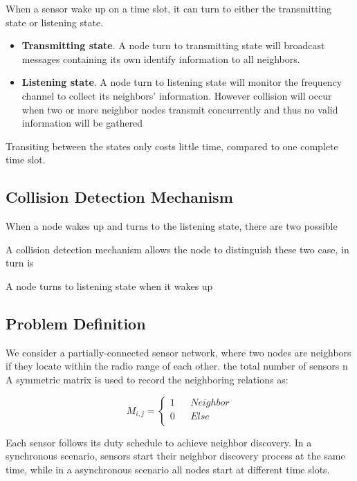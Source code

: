 When a sensor wake up on a time slot, it can turn to either the transmitting state or listening state. 
\begin{itemize}
\item \textbf{Transmitting state}. A node turn to transmitting state will broadcast messages containing its own identify 
information to all neighbors.
\item  \textbf{Listening state}. A node turn to listening state will monitor the frequency channel to collect its neighbors' information.
However collision will occur when two or more neighbor nodes transmit concurrently and thus no valid information will be gathered
\end{itemize}
Transiting between the states only costs little time, compared to one complete time slot.

\subsection{Collision Detection Mechanism}

When a node wakes up and turns to the listening state, there are two possible 



A collision detection mechanism allows the node to distinguish these two case, in turn is 


A node turns to listening state when it wakes up




\subsection{Problem Definition}

We consider a partially-connected sensor network, 
where two nodes are neighbors if they locate within the radio range of each other. the total number of sensors n
A  symmetric matrix is used to record the neighboring relations as:

$$ M_{i,j}=\left\{
\begin{aligned}
1  & & {Neighbor}\\
0  & & {Else}\\
\end{aligned}
\right.
$$

Each sensor follows its duty schedule to achieve neighbor discovery. In a synchronous scenario,
sensors start their neighbor discovery process at the same time, while in a asynchronous  scenario
all nodes start at different time slots.
 
